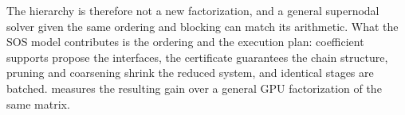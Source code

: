 The hierarchy is therefore not a new factorization, and a general supernodal
solver given the same ordering and blocking can match its arithmetic. What the SOS
model contributes is the ordering and the execution plan: coefficient supports
propose the interfaces, the certificate guarantees the chain structure, pruning
and coarsening shrink the reduced system, and identical stages are batched.
 measures the resulting gain over a general GPU factorization of
the same matrix.

